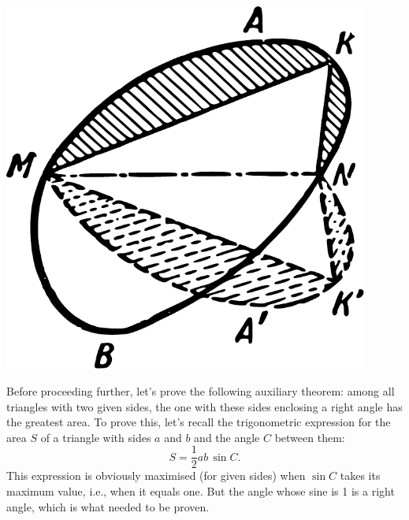 \begin{marginfigure}%
\centering
\includegraphics[width=0.9\textwidth]{figures/ch-12/fig-179.pdf}
\end{marginfigure}


Before proceeding further, let's prove the following auxiliary theorem: among all triangles with two given sides, the one with these sides enclosing a right angle has the greatest area. To prove this, let's recall the trigonometric expression for the area \(S\) of a triangle with sides \(a\) and \(b\) and the angle \(C\) between them:
\begin{equation*}%
S = \frac{1}{2} ab \, \sin C.
\end{equation*}
This expression is obviously maximised (for given sides) when \(\sin C\) takes its maximum value, i.e., when it equals one. But the angle whose sine is 1 is a right angle, which is what needed to be proven.


